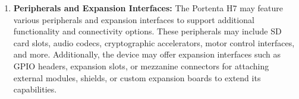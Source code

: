 \begin{enumerate}
	\item \textbf{Peripherals and Expansion Interfaces:} The Portenta H7 may feature various peripherals and expansion interfaces to support additional functionality and connectivity options. These peripherals may include SD card slots, audio codecs, cryptographic accelerators, motor control interfaces, and more. Additionally, the device may offer expansion interfaces such as GPIO headers, expansion slots, or mezzanine connectors for attaching external modules, shields, or custom expansion boards to extend its capabilities.
\end{enumerate}

